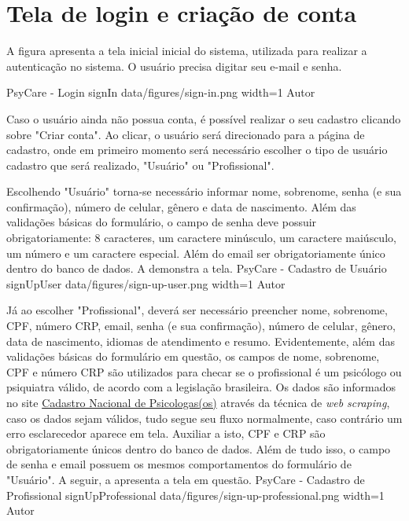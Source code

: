 \section{Tela de login e criação de conta}
\label{sec:loginCriacao}

A figura  apresenta a tela inicial inicial do sistema, utilizada para realizar a autenticação no sistema. O usuário precisa digitar seu e-mail e senha.

\image
    {PsyCare - Login}
    {signIn}
    {data/figures/sign-in.png}
    {width=1\textwidth}
    {Autor}

Caso o usuário ainda não possua conta, é possível realizar o seu cadastro clicando sobre "Criar conta". Ao clicar, o usuário será direcionado para a página de cadastro, onde em primeiro momento será necessário escolher o tipo de usuário cadastro que será realizado, "Usuário" ou "Profissional". 

Escolhendo "Usuário" torna-se necessário informar nome, sobrenome, senha (e sua confirmação), número de celular, gênero e data de nascimento. Além das validações básicas do formulário, o campo de senha deve possuir obrigatoriamente: 8 caracteres, um caractere minúsculo, um caractere maiúsculo, um número e um caractere especial. Além do email ser obrigatoriamente único dentro do banco de dados. A  demonstra a tela.
\image
    {PsyCare - Cadastro de Usuário}
    {signUpUser}
    {data/figures/sign-up-user.png}
    {width=1\textwidth}
    {Autor}

Já ao escolher "Profissional", deverá ser necessário preencher nome, sobrenome, CPF, número CRP, email, senha (e sua confirmação), número de celular, gênero, data de nascimento, idiomas de atendimento e resumo. Evidentemente, além das validações básicas do formulário em questão, os campos de nome, sobrenome, CPF e número CRP são utilizados para checar se o profissional é um psicólogo ou psiquiatra válido, de acordo com a legislação brasileira. Os dados são informados no site \href{https://cadastro.cfp.org.br/}{Cadastro Nacional de Psicologas(os)} através da técnica de \textit{web scraping}, caso os dados sejam válidos, tudo segue seu fluxo normalmente, caso contrário um erro esclarecedor aparece em tela. Auxiliar a isto, CPF e CRP são obrigatoriamente únicos dentro do banco de dados. Além de tudo isso, o campo de senha e email possuem os mesmos comportamentos do formulário de "Usuário". A seguir, a  apresenta a tela em questão.
\image
    {PsyCare - Cadastro de Profissional}
    {signUpProfessional}
    {data/figures/sign-up-professional.png}
    {width=1\textwidth}
    {Autor}